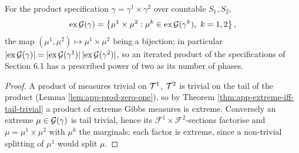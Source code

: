 \begin{theorem}
    \label{thm:app-product-extreme}
    \leanok

    For the product specification $\gamma = \gamma^1 \times \gamma^2$ over countable $S_1, S_2$,
    \[\mathrm{ex}\,\mathcal{G}(\gamma) = \left\{ \mu^1 \times \mu^2 :
      \mu^k \in \mathrm{ex}\,\mathcal{G}(\gamma^k),\ k = 1,2 \right\},\]
    the map $(\mu^1,\mu^2) \mapsto \mu^1 \times \mu^2$ being a bijection; in particular
    $|\mathrm{ex}\,\mathcal{G}(\gamma)| = |\mathrm{ex}\,\mathcal{G}(\gamma^1)|\,
    |\mathrm{ex}\,\mathcal{G}(\gamma^2)|$, so an iterated product of the specifications of
    Section 6.1 has a prescribed power of two as its number of phases.
\end{theorem}
\begin{proof}
    \leanok

    A product of measures trivial on $\mathcal{T}^1$, $\mathcal{T}^2$ is trivial on the tail of the product
    (Lemma \ref{lem:app-prod-zero-one}), so by Theorem \ref{thm:app-extreme-iff-tail-trivial} a
    product of extreme Gibbs measures is extreme. Conversely an extreme $\mu \in \mathcal{G}(\gamma)$
    is tail trivial, hence its $\mathcal{F}^1 \times \mathcal{F}^2$-sections factorise and
    $\mu = \mu^1 \times \mu^2$ with $\mu^k$ the marginals; each factor is extreme, since a
    non-trivial splitting of $\mu^1$ would split $\mu$.
\end{proof}

